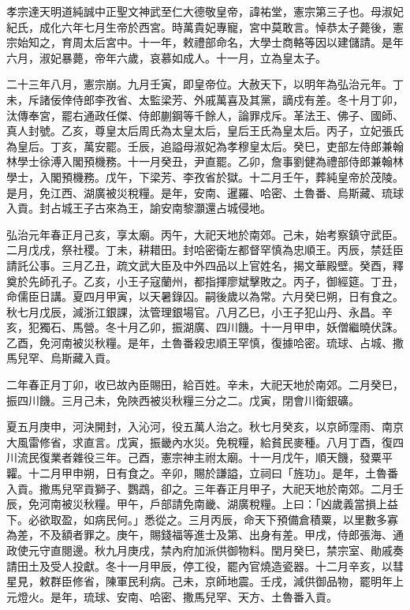 
\begin{pinyinscope}
孝宗達天明道純誠中正聖文神武至仁大德敬皇帝，諱祐堂，憲宗第三子也。母淑妃紀氏，成化六年七月生帝於西宮。時萬貴妃專寵，宮中莫敢言。悼恭太子薨後，憲宗始知之，育周太后宮中。十一年，敕禮部命名，大學士商輅等因以建儲請。是年六月，淑妃暴薨，帝年六歲，哀慕如成人。十一月，立為皇太子。

二十三年八月，憲宗崩。九月壬寅，即皇帝位。大赦天下，以明年為弘治元年。丁未，斥諸佞倖侍郎李孜省、太監梁芳、外戚萬喜及其黨，謫戍有差。冬十月丁卯，汰傳奉宮，罷右通政任傑、侍郎蒯鋼等千餘人，論罪戍斥。革法王、佛子、國師、真人封號。乙亥，尊皇太后周氏為太皇太后，皇后王氏為皇太后。丙子，立妃張氏為皇后。丁亥，萬安罷。壬辰，追謚母淑妃為孝穆皇太后。癸巳，吏部左侍郎兼翰林學士徐溥入閣預機務。十一月癸丑，尹直罷。乙卯，詹事劉健為禮部侍郎兼翰林學士，入閣預機務。戊午，下梁芳、李孜省於獄。十二月壬午，葬純皇帝於茂陵。是月，免江西、湖廣被災稅糧。是年，安南、暹羅、哈密、土魯番、烏斯藏、琉球入貢。封占城王子古來為王，諭安南黎灝還占城侵地。

弘治元年春正月己亥，享太廟。丙午，大祀天地於南郊。己未，始考察鎮守武臣。二月戊戌，祭社稷。丁未，耕耤田。封哈密衛左都督罕慎為忠順王。丙辰，禁廷臣請託公事。三月乙丑，疏文武大臣及中外四品以上官姓名，揭文華殿壁。癸酉，釋奠於先師孔子。乙亥，小王子寇蘭州，都指揮廖斌擊敗之。丙子，御經筵。丁丑，命儒臣日講。夏四月甲寅，以天暑錄囚。嗣後歲以為常。六月癸巳朔，日有食之。秋七月戊辰，減浙江銀課，汰管理銀場官。八月乙巳，小王子犯山丹、永昌。辛亥，犯獨石、馬營。冬十月乙卯，振湖廣、四川饑。十一月甲申，妖僧繼曉伏誅。乙酉，免河南被災秋糧。是年，土魯番殺忠順王罕慎，復據哈密。琉球、占城、撒馬兒罕、烏斯藏入貢。

二年春正月丁卯，收已故內臣賜田，給百姓。辛未，大祀天地於南郊。二月癸巳，振四川饑。三月己未，免陜西被災秋糧三分之二。戊寅，閉會川衛銀礦。

夏五月庚申，河決開封，入沁河，役五萬人治之。秋七月癸亥，以京師霪雨、南京大風雷修省，求直言。戊寅，振畿內水災。免稅糧，給貧民麥種。八月丁酉，復四川流民復業者雜役三年。己酉，憲宗神主祔太廟。十一月戊午，順天饑，發粟平糶。十二月甲申朔，日有食之。辛卯，賜於謙謚，立祠曰「旌功」。是年，土魯番入貢。撒馬兒罕貢獅子、鸚鵡，卻之。三年春正月甲子，大祀天地於南郊。二月壬辰，免河南被災秋糧。甲午，戶部請免南畿、湖廣稅糧。上曰：「凶歲義當損上益下。必欲取盈，如病民何。」悉從之。三月丙辰，命天下預備倉積粟，以里數多寡為差，不及額者罪之。庚午，賜錢福等進士及第、出身有差。甲戌，侍郎張海、通政使元守直閱邊。秋九月庚戌，禁內府加派供御物料。閏月癸巳，禁宗室、勛戚奏請田土及受人投獻。冬十一月甲辰，停工役，罷內官燒造瓷器。十二月辛亥，以彗星見，敕群臣修省，陳軍民利病。己未，京師地震。壬戌，減供御品物，罷明年上元燈火。是年，琉球、安南、哈密、撒馬兒罕、天方、土魯番入貢。


\end{pinyinscope}
